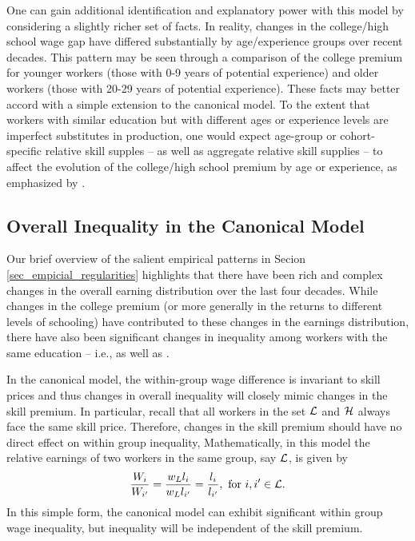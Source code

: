\documentclass[12pt]{article}
\newcommand{\highlightP}[1]{{\emph{\color{MyPink}{#1}}}}
\theoremstyle{definition}
\begin{document}
One can gain additional identification and explanatory power with this model by considering a slightly richer set of facts. In reality, changes in the college/high school wage gap have differed substantially by age/experience groups over recent decades. This pattern may be seen through a comparison of the college premium for younger workers (those with 0-9 years of potential experience) and older workers (those with 20-29 years of potential experience). These facts may better accord with a simple extension to the canonical model. To the extent that workers with similar education but with different ages or experience levels are imperfect substitutes in production, one would expect age-group or cohort-specific relative skill supples -- as well as aggregate relative skill supplies -- to affect the evolution of the college/high school premium by age or experience, as emphasized by \citet{cardCanFallingSupply2001}. 

\subsection{Overall Inequality in the Canonical Model} 

Our brief overview of the salient empirical patterns in Secion \ref{sec_empicial_regularities} highlights that there have been rich and complex changes in the overall earning distribution over the last four decades. While changes in the college premium (or more generally in the returns to different levels of schooling) have contributed to these changes in the earnings distribution, there have also been significant changes in inequality among workers with the same education -- i.e., \highlightP{within-groups} as well as \highlightP{between groups}.

In the canonical model, the within-group wage difference is invariant to skill prices and thus changes in overall inequality will closely mimic changes in the skill premium. In particular, recall that all workers in the set $\mathcal{L}$ and $\mathcal{H}$ always face the same skill price. Therefore, changes in the skill premium should have no direct effect on within group inequality, Mathematically, in this model the relative earnings of two workers in the same group, say $\mathcal{L}$, is given by 
\begin{equation}
    \label{canonical_model_within_group_diff}
    \frac{W_i}{W_{i^\prime}} = \frac{w_L l_i}{w_L l_{i^\prime}} = \frac{l_i}{l_{i^\prime}}, \text{ for  } i, i^\prime \in \mathcal{L} .
\end{equation}
In this simple form, the canonical model can exhibit significant within group wage inequality, but inequality will be independent of the skill premium.
\end{document}
